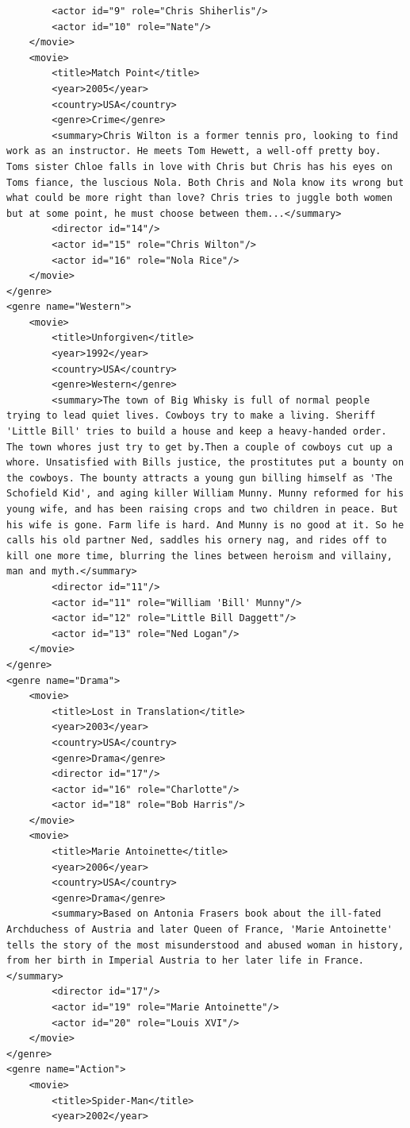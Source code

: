 \documentclass[a4paper, notitlepage]{article}
\begin{document}
\begin{enumerate}
\begin{lstlisting}
		<actor id="9" role="Chris Shiherlis"/>
		<actor id="10" role="Nate"/>
	</movie>
	<movie>
		<title>Match Point</title>
		<year>2005</year>
		<country>USA</country>
		<genre>Crime</genre>
		<summary>Chris Wilton is a former tennis pro, looking to find work as an instructor. He meets Tom Hewett, a well-off pretty boy. Toms sister Chloe falls in love with Chris but Chris has his eyes on Toms fiance, the luscious Nola. Both Chris and Nola know its wrong but what could be more right than love? Chris tries to juggle both women but at some point, he must choose between them...</summary>
		<director id="14"/>
		<actor id="15" role="Chris Wilton"/>
		<actor id="16" role="Nola Rice"/>
	</movie>
</genre>
<genre name="Western">
	<movie>
		<title>Unforgiven</title>
		<year>1992</year>
		<country>USA</country>
		<genre>Western</genre>
		<summary>The town of Big Whisky is full of normal people trying to lead quiet lives. Cowboys try to make a living. Sheriff 'Little Bill' tries to build a house and keep a heavy-handed order. The town whores just try to get by.Then a couple of cowboys cut up a whore. Unsatisfied with Bills justice, the prostitutes put a bounty on the cowboys. The bounty attracts a young gun billing himself as 'The Schofield Kid', and aging killer William Munny. Munny reformed for his young wife, and has been raising crops and two children in peace. But his wife is gone. Farm life is hard. And Munny is no good at it. So he calls his old partner Ned, saddles his ornery nag, and rides off to kill one more time, blurring the lines between heroism and villainy, man and myth.</summary>
		<director id="11"/>
		<actor id="11" role="William 'Bill' Munny"/>
		<actor id="12" role="Little Bill Daggett"/>
		<actor id="13" role="Ned Logan"/>
	</movie>
</genre>
<genre name="Drama">
	<movie>
		<title>Lost in Translation</title>
		<year>2003</year>
		<country>USA</country>
		<genre>Drama</genre>
		<director id="17"/>
		<actor id="16" role="Charlotte"/>
		<actor id="18" role="Bob Harris"/>
	</movie>
	<movie>
		<title>Marie Antoinette</title>
		<year>2006</year>
		<country>USA</country>
		<genre>Drama</genre>
		<summary>Based on Antonia Frasers book about the ill-fated Archduchess of Austria and later Queen of France, 'Marie Antoinette' tells the story of the most misunderstood and abused woman in history, from her birth in Imperial Austria to her later life in France. </summary>
		<director id="17"/>
		<actor id="19" role="Marie Antoinette"/>
		<actor id="20" role="Louis XVI"/>
	</movie>
</genre>
<genre name="Action">
	<movie>
		<title>Spider-Man</title>
		<year>2002</year>

\end{lstlisting}
\end{enumerate}
\end{document}
